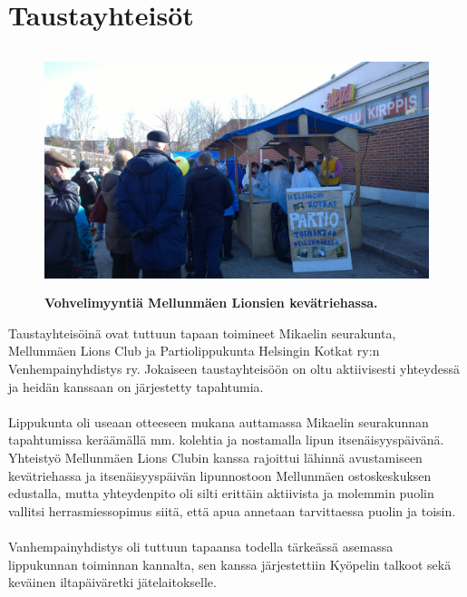 \section{Taustayhteisöt}
\begin{figure}[htb]
	\begin{center}
		\includegraphics[height=7cm]{kuvat/lettukestit.jpg}
	\end{center}
	\captionsetup{labelformat=empty}
	\caption{\textbf{Vohvelimyyntiä Mellunmäen Lionsien kevätriehassa.}}
\end{figure}

Taustayhteisöinä ovat tuttuun tapaan toimineet Mikaelin seurakunta, Mellunmäen Lions Club ja Partiolippukunta Helsingin Kotkat ry:n Venhempainyhdistys ry. Jokaiseen taustayhteisöön on oltu aktiivisesti yhteydessä ja heidän kanssaan on järjestetty tapahtumia.\\
\\Lippukunta oli useaan otteeseen mukana auttamassa Mikaelin seurakunnan tapahtumissa keräämällä mm. kolehtia ja nostamalla lipun itsenäisyyspäivänä. Yhteistyö Mellunmäen Lions Clubin kanssa rajoittui lähinnä avustamiseen kevätriehassa ja itsenäisyyspäivän lipunnostoon Mellunmäen ostoskeskuksen edustalla, mutta yhteydenpito oli silti erittäin aktiivista ja molemmin puolin vallitsi herrasmiessopimus siitä, että apua annetaan tarvittaessa puolin ja toisin.\\
\\Vanhempainyhdistys oli tuttuun tapaansa todella tärkeässä asemassa lippukunnan toiminnan kannalta, sen kanssa järjestettiin Kyöpelin talkoot sekä keväinen iltapäiväretki jätelaitokselle. 

